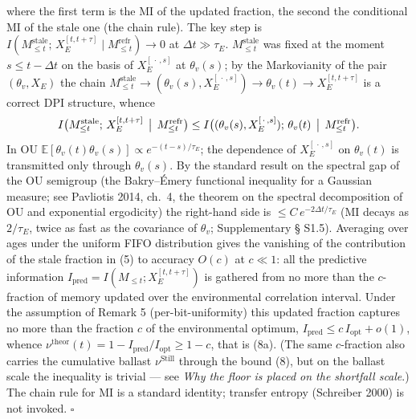 \documentclass[pdflatex,sn-mathphys-ay]{sn-jnl}
\begin{document}
where the first term is the MI of the updated fraction, the second the conditional MI of the stale one (the chain rule). The key step is \(I(M_{\le t}^{\text{stale}};\, X_E^{[t,t+\tau]} \mid M_{\le t}^{\text{refr}}) \to 0\) at \(\Delta t \gg \tau_E\). \(M_{\le t}^{\text{stale}}\) was fixed at the moment \(s \le t - \Delta t\) on the basis of \(X_E^{[\,\cdot\,, s]}\) at \(\theta_v(s)\); by the Markovianity of the pair \((\theta_v, X_E)\) the chain \(M_{\le t}^{\text{stale}} \to (\theta_v(s), X_E^{[\,\cdot\,,s]}) \to \theta_v(t) \to X_E^{[t,t+\tau]}\) is a correct DPI structure, whence \[I\bigl(M_{\le t}^{\text{stale}};\, X_E^{[t,t+\tau]} \,\bigm|\, M_{\le t}^{\text{refr}}\bigr) \le I\bigl((\theta_v(s), X_E^{[\,\cdot\,,s]});\, \theta_v(t) \,\bigm|\, M_{\le t}^{\text{refr}}\bigr).\] In OU \(\mathbb{E}[\theta_v(t)\theta_v(s)] \propto e^{-(t-s)/\tau_E}\); the dependence of \(X_E^{[\,\cdot\,,s]}\) on \(\theta_v(t)\) is transmitted only through \(\theta_v(s)\). By the standard result on the spectral gap of the OU semigroup (the Bakry--Émery functional inequality for a Gaussian measure; see Pavliotis 2014, ch.~4, the theorem on the spectral decomposition of OU and exponential ergodicity) the right-hand side is \(\le C\,e^{-2\Delta t/\tau_E}\) (MI decays as \(2/\tau_E\), twice as fast as the covariance of \(\theta_v\); Supplementary § S1.5). Averaging over ages under the uniform FIFO distribution gives the vanishing of the contribution of the stale fraction in (5) to accuracy \(O(c)\) at \(c \ll 1\): all the predictive information \(I_{\text{pred}} = I(M_{\le t}; X_E^{[t,t+\tau]})\) is gathered from no more than the \(c\)-fraction of memory updated over the environmental correlation interval. Under the assumption of Remark 5 (per-bit-uniformity) this updated fraction captures no more than the fraction \(c\) of the environmental optimum, \(I_{\text{pred}} \le c\, I_{\text{opt}} + o(1)\), whence \(\nu^{\text{theor}}(t) = 1 - I_{\text{pred}}/I_{\text{opt}} \ge 1 - c\), that is (8a). (The same \(c\)-fraction also carries the cumulative ballast \(\nu^{\text{Still}}\) through the bound (8), but on the ballast scale the inequality is trivial --- see \emph{Why the floor is placed on the shortfall scale}.) The chain rule for MI is a standard identity; transfer entropy (Schreiber 2000) is not invoked. \(\square\)
\end{document}
